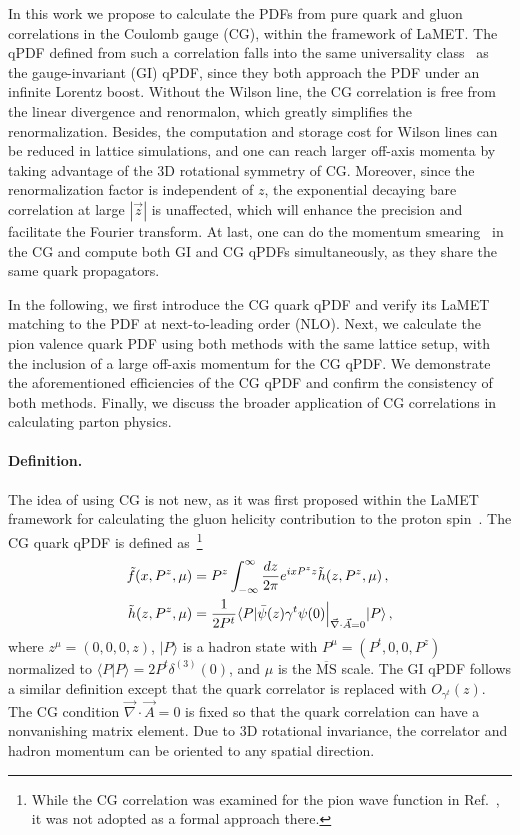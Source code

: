 \documentclass[prd,twocolumn,preprintnumbers,showpacs,nofootinbib,superscriptaddress,notitlepage,floatfix]{revtex4-1}
\newcommand{\MS}{{\overline{\mathrm{MS}}}}
\begin{document}
In this work we propose to calculate the PDFs from pure quark and gluon correlations in the Coulomb gauge (CG), within the framework of LaMET. The qPDF defined from such a correlation falls into the same universality class~\cite{Hatta:2013gta,Ji:2020ect} as the gauge-invariant (GI) qPDF, since they both approach the PDF under an infinite Lorentz boost. 
Without the Wilson line, the CG correlation is free from the linear divergence and renormalon, which greatly simplifies the renormalization. 
Besides, the computation and storage cost for Wilson lines can be reduced in lattice simulations, and one can reach larger off-axis momenta by taking advantage of the 3D rotational symmetry of CG. Moreover, since the renormalization factor is independent of $z$, the exponential decaying bare correlation at large $|\vec{z}|$ is unaffected, which will enhance the precision and facilitate the Fourier transform.
At last, one can do the momentum smearing~\cite{Izubuchi:2019lyk,Gao:2020ito} in the CG and compute both GI and CG qPDFs simultaneously, as they share the same quark propagators.

In the following, we first introduce the CG quark qPDF and verify its LaMET matching to the PDF at next-to-leading order (NLO). Next, we calculate the pion valence quark PDF using both methods with the same lattice setup, with the inclusion of a large off-axis momentum for the CG qPDF. 
We demonstrate the aforementioned efficiencies of the CG qPDF and confirm the consistency of both methods. 
Finally, we discuss the broader application of CG correlations in calculating parton physics.

\paragraph*{Definition.} The idea of using CG is not new, as it was first proposed within the LaMET framework for calculating the gluon helicity contribution to the proton spin~\cite{Ji:2013fga,Hatta:2013gta,Ji:2014lra,Yang:2016plb}.
The CG quark qPDF is defined as~\footnote{While the CG correlation was examined for the pion wave function in Ref.~\cite{Gupta:1993vp}, it was not adopted as a formal approach there.}
\begin{align}
    \tilde f(x,P^z,\mu) &= P^z\int_{-\infty}^\infty \frac{dz}{2\pi} e^{i x P^z z} \tilde h(z,P^z,\mu)\,,\\
    \tilde h(z,P^z,\mu) &= {1\over 2P^t}\langle P| \bar{\psi}(z)\gamma^t \psi(0)\Big|_{\vec{\nabla}\cdot \vec{A}=0}|P\rangle\,,
\end{align}
where $z^\mu=(0,0,0,z)$, $|P\rangle$ is a hadron state with $P^\mu=(P^t,0,0,P^z)$ normalized to $\langle P|P\rangle = 2P^t\delta^{(3)}(0)$, and $\mu$ is the $\MS$ scale. The GI qPDF follows a similar definition except that the quark correlator is replaced with $O_{\gamma^t}(z)$. The CG condition $\vec{\nabla}\cdot \vec{A}=0$ is fixed so that the quark correlation can have a nonvanishing matrix element. Due to 3D rotational invariance, the correlator and hadron momentum can be oriented to any spatial direction.
\end{document}
